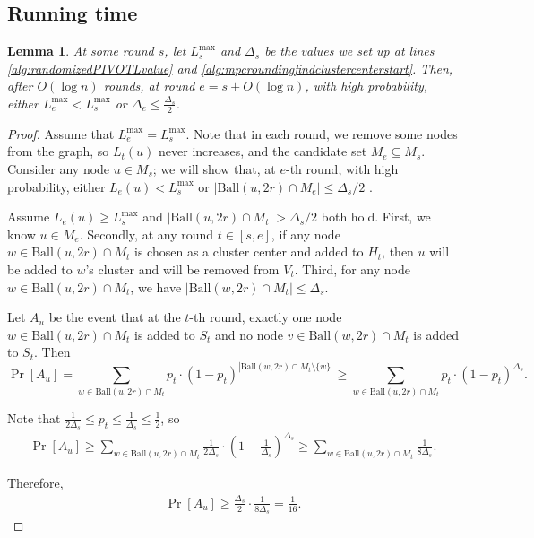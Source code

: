 \documentclass[11pt]{article}
\newtheorem{lemma}[theorem]{Lemma}
\begin{document}
\begin{CJK*}{UTF8}{gbsn}
\subsection{Running time}

\begin{lemma}
\label{lem:mpcroundingrunningtimebase}
At some round $s$, let $L^{\max}_s$ and $\Delta_s$ be the values we set up at lines \ref{alg:randomizedPIVOTLvalue} and \ref{alg:mpcroundingfindclustercenterstart}. Then, after $O(\log n)$ rounds, at round $e = s + O(\log n)$, with high probability, either $L^{\max}_e < L^{\max}_s$ or $\Delta_e \leq \frac{\Delta_s}{2}$.
\end{lemma}

\begin{proof}
Assume that $L^{\max}_e = L^{\max}_s$. Note that in each round, we remove some nodes from the graph, so $L_t(u)$ never increases, and the candidate set $M_e \subseteq M_s$. Consider any node $u \in M_s$; we will show that, at $e$-th round, with high probability, either $L_e(u) < L^{\max}_s$ or $|\text{Ball}(u, 2r) \cap M_e| \leq \Delta_s / 2$ .

Assume $L_e(u) \geq L^{\max}_s$ and $|\text{Ball}(u, 2r) \cap M_t| > \Delta_s / 2$ both hold. First, we know $u \in M_e$. Secondly, at any round $t \in [s, e]$, if any node $w \in \text{Ball}(u, 2r) \cap M_t$ is chosen as a cluster center and added to $H_t$, then $u$ will be added to $w$'s cluster and will be removed from $V_t$. Third, for any node $w \in \text{Ball}(u, 2r) \cap M_t$, we have $|\text{Ball}(w, 2r) \cap M_t| \leq \Delta_s$.

Let $A_u$ be the event that at the $t$-th round, exactly one node $w \in \text{Ball}(u, 2r) \cap M_t$ is added to $S_t$ and no node $v \in \text{Ball}(w, 2r) \cap M_t$ is added to $S_t$. Then
\[
\Pr[A_u] = \sum_{w \in \text{Ball}(u, 2r) \cap M_t} p_t \cdot (1 - p_t)^{|\text{Ball}(w, 2r) \cap M_t \setminus \{ w \}|} \geq \sum_{w \in \text{Ball}(u, 2r) \cap M_t} p_t \cdot (1 - p_t)^{\Delta_s}.
\]

Note that $\frac{1}{2\Delta_s} \leq p_t \leq \frac{1}{\Delta_s} \leq \frac{1}{2}$, so
\begin{align*}
    \Pr[A_u] \geq \sum_{w \in \text{Ball}(u, 2r) \cap M_t} \frac{1}{2\Delta_s} \cdot \left(1 - \frac{1}{\Delta_s}\right)^{\Delta_s} \geq \sum_{w \in \text{Ball}(u, 2r) \cap M_t} \frac{1}{8\Delta_s}.
\end{align*}



Therefore,
\begin{align*}
    \Pr[A_u] \geq \frac{\Delta_s}{2} \cdot \frac{1}{8\Delta_s} = \frac{1}{16}.
\end{align*}



\end{proof}
\end{CJK*}
\end{document}
